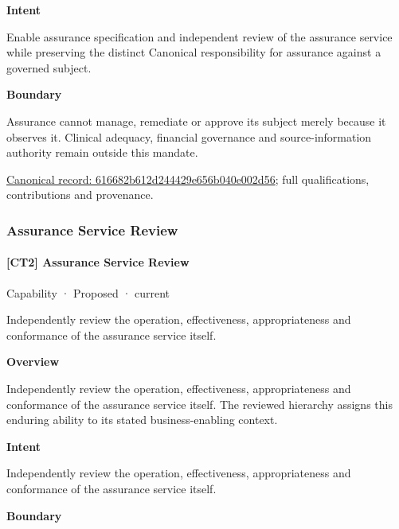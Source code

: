 \textbf{Intent}



Enable assurance specification and independent review of the assurance service while preserving the distinct Canonical responsibility for assurance against a governed subject.



\textbf{Boundary}



Assurance cannot manage, remediate or approve its subject merely because it observes it. Clinical adequacy, financial governance and source-information authority remain outside this mandate.


{\footnotesize \href{../../../../continuum/strategy/capability/616682b612d244429e656b040e002d56.md}{Canonical record: 616682b612d244429e656b040e002d56}; full qualifications, contributions and provenance.}\par
\subsubsection{Assurance Service Review}

\paragraph{[CT2] Assurance Service Review}

\label{element:b1a791458d644d4794895e4fa42ec83c}
{\small Capability · Proposed · current}\par

Independently review the operation, effectiveness, appropriateness and conformance of the assurance service itself.



\textbf{Overview}



Independently review the operation, effectiveness, appropriateness and conformance of the assurance service itself. The reviewed hierarchy assigns this enduring ability to its stated business-enabling context.



\textbf{Intent}



Independently review the operation, effectiveness, appropriateness and conformance of the assurance service itself.



\textbf{Boundary}



